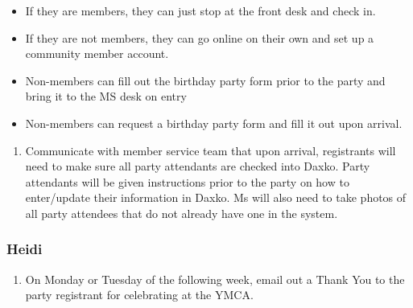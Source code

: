 \documentclass[
]{report}
\providecommand{\tightlist}{%
  \setlength{\itemsep}{0pt}\setlength{\parskip}{0pt}}\usepackage{longtable,booktabs,array}
\begin{document}
\begin{itemize}
\tightlist
\item
  If they are members, they can just stop at the front desk and check
  in.
\item
  If they are not members, they can go online on their own and set up a
  community member account.
\item
  Non-members can fill out the birthday party form prior to the party
  and bring it to the MS desk on entry
\item
  Non-members can request a birthday party form and fill it out upon
  arrival.
\end{itemize}

\begin{enumerate}
\def\labelenumi{\arabic{enumi}.}
\setcounter{enumi}{16}
\tightlist
\item
  Communicate with member service team that upon arrival, registrants
  will need to make sure all party attendants are checked into Daxko.
  Party attendants will be given instructions prior to the party on how
  to enter/update their information in Daxko. Ms will also need to take
  photos of all party attendees that do not already have one in the
  system.
\end{enumerate}

\hypertarget{heidi-2}{%
\subsubsection{Heidi}\label{heidi-2}}

\begin{enumerate}
\def\labelenumi{\arabic{enumi}.}
\setcounter{enumi}{17}
\tightlist
\item
  On Monday or Tuesday of the following week, email out a Thank You to
  the party registrant for celebrating at the YMCA.
\end{enumerate}
\end{document}
